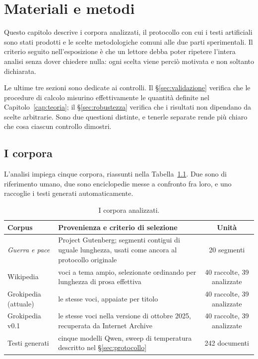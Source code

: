 
\chapter{Materiali e metodi}
\label{cap:metodi}

Questo capitolo descrive i corpora analizzati, il protocollo con cui i testi
artificiali sono stati prodotti e le scelte metodologiche comuni alle due parti
sperimentali. Il criterio seguito nell'esposizione è che un lettore debba poter
ripetere l'intera analisi senza dover chiedere nulla: ogni scelta viene perciò
motivata e non soltanto dichiarata.

Le ultime tre sezioni sono dedicate ai controlli. Il §\ref{sec:validazione}
verifica che le procedure di calcolo misurino effettivamente le quantità
definite nel Capitolo~\ref{cap:teoria}; il §\ref{sec:robustezza} verifica che i
risultati non dipendano da scelte arbitrarie. Sono due questioni distinte, e
tenerle separate rende più chiaro che cosa ciascun controllo dimostri.

\section{I corpora}
\label{sec:corpora}

L'analisi impiega cinque corpora, riassunti nella Tabella~\ref{tab:corpora}.
Due sono di riferimento umano, due sono enciclopedie messe a confronto fra loro,
e uno raccoglie i testi generati automaticamente.

\begin{table}[htbp]
\centering
\small
\begin{tabular}{@{}l>{\raggedright\arraybackslash}p{5.9cm}c@{}}
\toprule
Corpus & Provenienza e criterio di selezione & Unità \\
\midrule
\emph{Guerra e pace} & Project Gutenberg; segmenti contigui di uguale lunghezza,
usati come ancora al protocollo originale & 20 segmenti \\
\addlinespace
Wikipedia & voci a tema ampio, selezionate ordinando per lunghezza di prosa
effettiva & 40 raccolte, 39 analizzate \\
\addlinespace
Grokipedia (attuale) & le stesse voci, appaiate per titolo & 40 raccolte, 39
analizzate \\
\addlinespace
Grokipedia v0.1 & le stesse voci nella versione di ottobre 2025, recuperata da
Internet Archive & 40 raccolte, 39 analizzate \\
\addlinespace
Testi generati & cinque modelli Qwen, sweep di temperatura descritto nel
§\ref{sec:protocollo} & 242 documenti \\
\bottomrule
\end{tabular}
\caption{I corpora analizzati.}
\label{tab:corpora}
\end{table}

